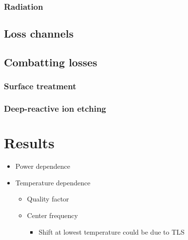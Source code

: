 \documentclass[12pt]{report}
\begin{document}
\subsubsection{Radiation}




\subsection{Loss channels}






\subsection{Combatting losses}

\subsubsection{Surface treatment}

\subsubsection{Deep-reactive ion etching}

















\section{Results}
\begin{itemize}
    \item Power dependence
    \item Temperature dependence
    \begin{itemize}
        \item Quality factor
        \item Center frequency
        \begin{itemize}
            \item Shift at lowest temperature could be due to TLS \cite[p.~91]{Geerlings}
        \end{itemize}
    \end{itemize}
\end{itemize}
\end{document}
